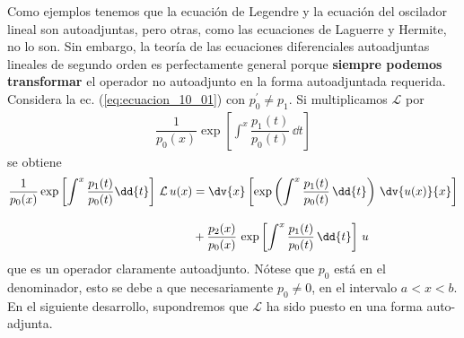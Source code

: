 \par
Como ejemplos tenemos que la ecuación de Legendre y la ecuación del oscilador lineal son autoadjuntas, pero otras, como las ecuaciones de Laguerre y Hermite, no lo son. Sin embargo, la teoría de las ecuaciones diferenciales autoadjuntas lineales de segundo orden es perfectamente general porque \textbf{siempre podemos transformar} el operador no autoadjunto en la forma autoadjuntada requerida. Considera la ec. (\ref{eq:ecuacion_10_01}) con $p_{0}^{\prime} \neq p_{1}$. Si multiplicamos $\mathcal{L}$ por
\begin{align*}
\dfrac{1}{p_{0}(x)} \exp \left[ \int^{x} \dfrac{p_{1}(t)}{p_{0}(t)} \, \dd{t} \right]
\end{align*}
se obtiene
\begin{align}
\begin{aligned}
\dfrac{1}{p_{0}(x)} \exp \left[ \int^{x} \dfrac{p_{1}(t)}{p_{0}(t)} \dd{t} \right] \, \mathcal{L} \, u(x) &= \dv{x} \left[ \exp \left( \int^{x} \dfrac{p_{1}(t)}{p_{0}(t)} \, \dd{t} \right) \, \dv{u(x)}{x} \right] \\[1em]
&+ \dfrac{p_{2}(x)}{p_{0}(x)} \, \exp \left[ \int^{x} \dfrac{p_{1}(t)}{p_{0}(t)} \, \dd{t} \right] \, u
\end{aligned}
\label{eq:ecuacion_10_07}
\end{align}
que es un operador claramente autoadjunto. Nótese que $p_{0}$ está en el denominador, esto se debe a que necesariamente $p_{0} \neq 0$, en el intervalo $a < x < b$. En el siguiente desarrollo, supondremos que $\mathcal{L}$ ha sido puesto en una forma auto-adjunta.
